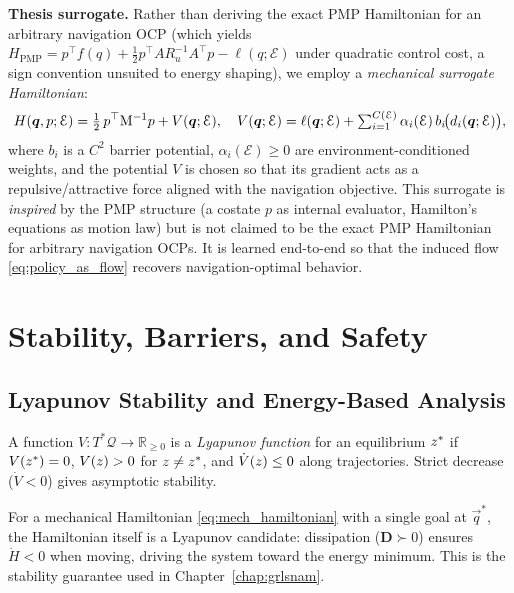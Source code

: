 \textbf{Thesis surrogate.}
Rather than deriving the exact PMP Hamiltonian for an arbitrary navigation OCP
(which yields $H_{\mathrm{PMP}} = p^\top f(q) + \tfrac{1}{2}p^\top A R_u^{-1} A^\top p - \ell(q;\mathcal{E})$
under quadratic control cost, a sign convention unsuited to energy shaping),
we employ a \emph{mechanical surrogate Hamiltonian}:
\begin{equation}
H(\boldsymbol{q},p;\mathcal{E})
= \tfrac{1}{2}\,p^\top\mathrm{M}^{-1}p
  + V(\boldsymbol{q};\mathcal{E}),
\quad
V(\boldsymbol{q};\mathcal{E})
= \ell(\boldsymbol{q};\mathcal{E})
  + \textstyle\sum_{i=1}^{C(\mathcal{E})} \alpha_i(\mathcal{E})\,
    b_i\!\bigl(d_i(\boldsymbol{q};\mathcal{E})\bigr),
\label{eq:reduced_ham_prelim}
\end{equation}
where $b_i$ is a $C^2$ barrier potential, $\alpha_i(\mathcal{E})\geq 0$
are environment-conditioned weights, and the potential $V$ is chosen so
that its gradient acts as a repulsive/attractive force aligned with the
navigation objective.
This surrogate is \emph{inspired} by the PMP structure (a costate $p$ as
internal evaluator, Hamilton's equations as motion law) but is not claimed
to be the exact PMP Hamiltonian for arbitrary navigation OCPs.
It is learned end-to-end so that the induced flow \eqref{eq:policy_as_flow}
recovers navigation-optimal behavior.

\section{Stability, Barriers, and Safety}
\label{sec:prelim:stability}

\subsection{Lyapunov Stability and Energy-Based Analysis}
\label{subsec:prelim:lyapunov}

\begin{definition}
\label{def:lyapunov}
A function $V : T^*\mathcal{Q} \to \mathbb{R}_{\geq 0}$ is a
\emph{Lyapunov function} for an equilibrium $z^*$ if
$V(z^*) = 0$, $V(z) > 0$ for $z \neq z^*$,
and $\dot{V}(z) \leq 0$ along trajectories.
Strict decrease ($\dot{V} < 0$) gives asymptotic stability.
\end{definition}

For a mechanical Hamiltonian \eqref{eq:mech_hamiltonian} with a single goal
at $\vec{q}^*$, the Hamiltonian itself is a Lyapunov candidate: dissipation
($\mathbf{D} \succ 0$) ensures $\dot{H} < 0$ when moving, driving the
system toward the energy minimum.
This is the stability guarantee used in Chapter~\ref{chap:grlsnam}.


